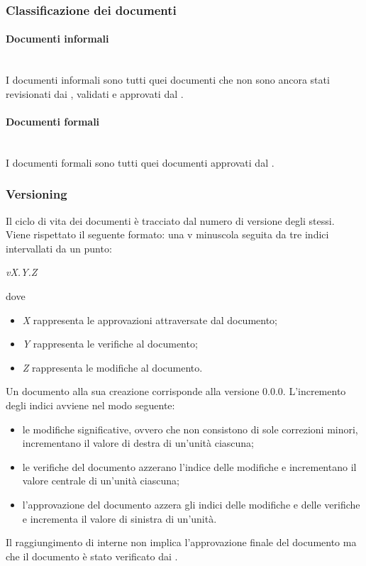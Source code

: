 \subsubsection{Classificazione dei documenti}
\paragraph{Documenti informali}\mbox{}\\
I documenti informali sono tutti quei documenti che non sono ancora stati revisionati dai \Verificatori{}, validati e approvati dal \Responsabile{}.

\paragraph{Documenti formali}\mbox{}\\
I documenti formali sono tutti quei documenti approvati dal \Responsabile{}.

\subsubsection{Versioning}
Il ciclo di vita dei documenti è tracciato dal numero di versione degli stessi.\\
Viene rispettato il seguente formato: una v minuscola seguita da tre indici intervallati da un punto:
\begin{center}
	\textit{vX.Y.Z}
\end{center}
dove
\begin{itemize}
	\item \textit{X} rappresenta le approvazioni attraversate dal documento;
	\item \textit{Y} rappresenta le verifiche al documento;
	\item \textit{Z} rappresenta le modifiche al documento.
\end{itemize}
Un documento alla sua creazione corrisponde alla versione 0.0.0. L’incremento degli indici avviene nel modo seguente:
\begin{itemize}
	\item le modifiche significative, ovvero che non consistono di sole correzioni minori, incrementano il valore di destra di un'unità ciascuna;
	\item le verifiche del documento azzerano l'indice delle modifiche e incrementano il valore centrale di un'unità ciascuna;
	\item l'approvazione del documento azzera gli indici delle modifiche e delle verifiche e incrementa il valore di sinistra di un'unità.
\end{itemize}
Il raggiungimento di  interne non implica l'approvazione finale del documento ma che il documento è stato verificato dai \Verificatori{}.

